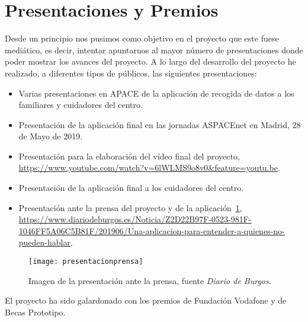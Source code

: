 \section{Presentaciones y Premios}
Desde un principio nos pusimos como objetivo en el proyecto que este fuese mediático, es decir, intentar apuntarnos al mayor número de presentaciones donde poder mostrar los avances del proyecto. A lo largo del desarrollo del proyecto he realizado, a diferentes tipos de públicos, las siguientes presentaciones:
\begin{itemize}
	\item Varias presentaciones en APACE de la aplicación de recogida de datos a los familiares y cuidadores del centro.
	\item Presentación de la aplicación final en las jornadas ASPACEnet en Madrid, 28 de Mayo de 2019.
	\item Presentación para la elaboración del vídeo final del proyecto, \url{https://www.youtube.com/watch?v=6lWLMS9o8v0&feature=youtu.be}.
	\item Presentación de la aplicación final a los cuidadores del centro.
	\item Presentación ante la prensa del proyecto y de la aplicación~\ref{fig:presprensa}, \url{https://www.diariodeburgos.es/Noticia/Z2D22B97F-0523-981F-1046FF5A06C5B81F/201906/Una-aplicacion-para-entender-a-quienes-no-pueden-hablar}.
\end{itemize}

\begin{figure}
	\centering
	\texttt{[image: presentacionprensa]}
	\caption{Imagen de la presentación ante la prensa, fuente \textit{Diario de Burgos}.}
	\label{fig:presprensa}
\end{figure}

El proyecto ha sido galardonado con los premios de Fundación Vodafone y de Becas Prototipo.